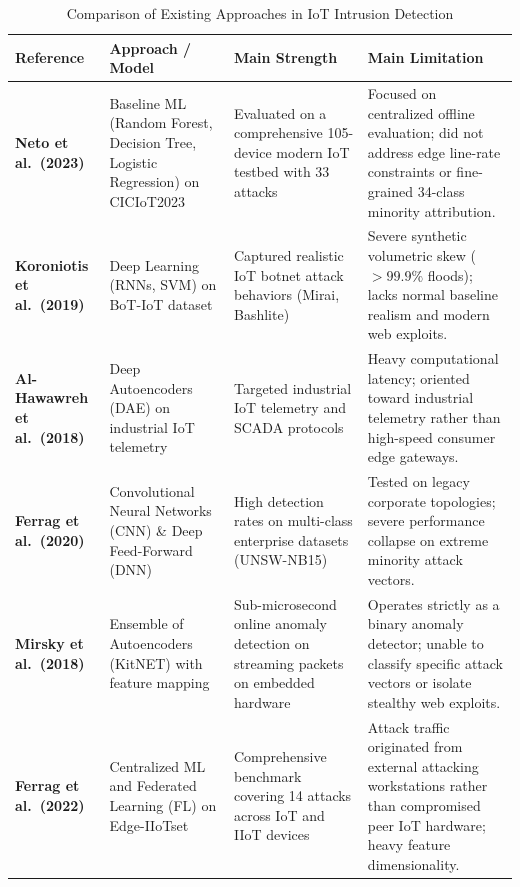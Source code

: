 \documentclass[12pt,a4paper]{report}
\begin{document}
\begin{table}[ht]
\centering
\caption{Comparison of Existing Approaches in IoT Intrusion Detection}
\label{tab:lit_comparison}
\small
\begin{tabular}{@{}p{3.2cm}p{3.5cm}p{4cm}p{4cm}@{}}
\toprule
\textbf{Reference} & \textbf{Approach / Model} & \textbf{Main Strength} & \textbf{Main Limitation}\\
\midrule
\textbf{Neto et al.\ (2023)} \newline \cite{ciciot2023} & Baseline ML (Random Forest, Decision Tree, Logistic Regression) on CICIoT2023 & Evaluated on a comprehensive 105-device modern IoT testbed with 33 attacks & Focused on centralized offline evaluation; did not address edge line-rate constraints or fine-grained 34-class minority attribution. \\
\addlinespace
\textbf{Koroniotis et al.\ (2019)} \cite{botiot} & Deep Learning (RNNs, SVM) on BoT-IoT dataset & Captured realistic IoT botnet attack behaviors (Mirai, Bashlite) & Severe synthetic volumetric skew ($>99.9\%$ floods); lacks normal baseline realism and modern web exploits. \\
\addlinespace
\textbf{Al-Hawawreh et al.\ (2018)} \cite{alhawawreh2018} & Deep Autoencoders (DAE) on industrial IoT telemetry & Targeted industrial IoT telemetry and SCADA protocols & Heavy computational latency; oriented toward industrial telemetry rather than high-speed consumer edge gateways. \\
\addlinespace
\textbf{Ferrag et al.\ (2020)} \cite{ferrag2020} & Convolutional Neural Networks (CNN) \& Deep Feed-Forward (DNN) & High detection rates on multi-class enterprise datasets (UNSW-NB15) & Tested on legacy corporate topologies; severe performance collapse on extreme minority attack vectors. \\
\addlinespace
\textbf{Mirsky et al.\ (2018)} \cite{kitsune} & Ensemble of Autoencoders (KitNET) with feature mapping & Sub-microsecond online anomaly detection on streaming packets on embedded hardware & Operates strictly as a binary anomaly detector; unable to classify specific attack vectors or isolate stealthy web exploits. \\
\addlinespace
\textbf{Ferrag et al.\ (2022)} \cite{edgeiiot} & Centralized ML and Federated Learning (FL) on Edge-IIoTset & Comprehensive benchmark covering 14 attacks across IoT and IIoT devices & Attack traffic originated from external attacking workstations rather than compromised peer IoT hardware; heavy feature dimensionality. \\
\bottomrule
\end{tabular}
\end{table}
\end{document}
